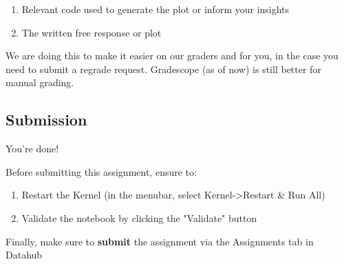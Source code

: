 \documentclass[11pt]{article}
\providecommand{\tightlist}{%
      \setlength{\itemsep}{0pt}\setlength{\parskip}{0pt}}
\begin{document}
\begin{enumerate}
\def\labelenumi{\arabic{enumi}.}
\tightlist
\item
  Relevant code used to generate the plot or inform your insights
\item
  The written free response or plot
\end{enumerate}

We are doing this to make it easier on our graders and for you, in the
case you need to submit a regrade request. Gradescope (as of now) is
still better for manual grading.

    \subsection{Submission}\label{submission}

You're done!

Before submitting this assignment, ensure to:

\begin{enumerate}
\def\labelenumi{\arabic{enumi}.}
\tightlist
\item
  Restart the Kernel (in the menubar, select
  Kernel-\textgreater{}Restart \& Run All)
\item
  Validate the notebook by clicking the "Validate" button
\end{enumerate}

Finally, make sure to \textbf{submit} the assignment via the Assignments
tab in Datahub


    
    
    
    
\end{document}
